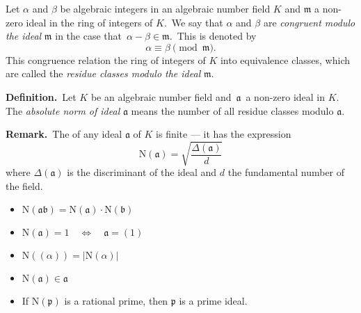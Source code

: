 \documentclass[12pt]{article}
\theoremstyle{definition}
\def\N{\mathrm{N}}
\begin{document}
Let $\alpha$ and $\beta$ be algebraic integers in an algebraic number field $K$ and $\mathfrak{m}$ a non-zero ideal in the ring of integers of $K$.\, We say that $\alpha$ and $\beta$ are {\em congruent modulo the ideal} $\mathfrak{m}$ in the case that\, $\alpha\!-\!\beta \in \mathfrak{m}$.\, This is denoted by
    $$\alpha \equiv \beta \pmod{\mathfrak{m}}.$$
This congruence relation  the ring of integers of $K$ into equivalence classes, which are called the {\em residue classes modulo the ideal} $\mathfrak{m}$.

\textbf{Definition.}\, Let $K$ be an algebraic number field and\, $\mathfrak{a}$\, a non-zero ideal in $K$.\, The {\em absolute norm of ideal} $\mathfrak{a}$ means the number of all residue classes modulo $\mathfrak{a}$.

\textbf{Remark.}\, The  of any ideal $\mathfrak{a}$ of $K$ is finite --- it has the expression
  $$\N(\mathfrak{a}) = \sqrt{\frac{\Delta(\mathfrak{a})}{d}}$$
where $\Delta(\mathfrak{a})$ is the discriminant of the ideal and $d$ the fundamental number of the field.

\begin{itemize}
\item $\N(\mathfrak{ab}) 
  = \N(\mathfrak{a})\!\cdot\!\N(\mathfrak{b})$ 
\item $\N(\mathfrak{a}) = 1 \quad\Leftrightarrow\quad \mathfrak{a} = (1)$
\item $\N((\alpha)) = |\N(\alpha)|$
\item $\N(\mathfrak{a}) \in \mathfrak{a}$
\item If $\N(\mathfrak{p})$ is a rational prime, then $\mathfrak{p}$ is a prime ideal.
\end{itemize}
\end{document}
